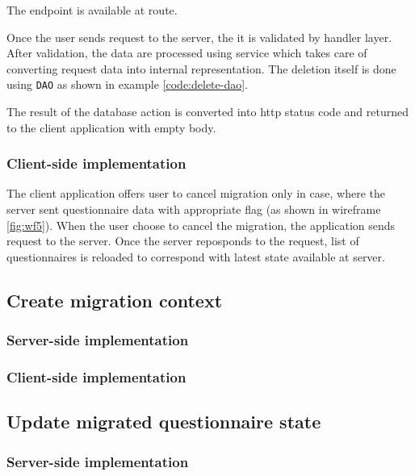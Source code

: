 The endpoint is available at  route.

Once the user sends request to the server, the it is validated by handler layer.
After validation, the data are processed using service which takes care of converting request data into internal representation.
The deletion itself is done using \texttt{DAO} as shown in example \ref{code:delete-dao}.


The result of the database action is converted into \gls{http} status code and returned to the client application with empty body.

\subsubsection*{Client-side implementation}

The client application offers user to cancel migration only in case, where the server sent questionnaire data with appropriate flag (as shown in wireframe \ref{fig:wf5}).
When the user choose to cancel the migration, the application sends request to the server.
Once the server reposponds to the request, list of questionnaires is reloaded to correspond with latest state available at server.

\subsection{Create migration context}

\subsubsection*{Server-side implementation}

\subsubsection*{Client-side implementation}

\subsection{Update migrated questionnaire state}

\subsubsection*{Server-side implementation}

